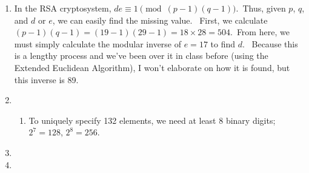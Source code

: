 \documentclass[12pt,letterpaper]{article}
\begin{document}
\pagestyle{fancy}
\rhead{\today}

\begin{enumerate}

    \item
        In the RSA cryptosystem, $de\equiv 1 \pmod {(p-1)(q-1)}$.~Thus, given $p$, $q$, and $d$ or $e$, we can easily find the missing value.~
        First, we calculate $(p-1)(q-1) = (19-1)(29-1) = 18\times28 = 504$.~From here, we must simply calculate the modular inverse of $e = 17$ to find $d$.~
        Because this is a lengthy process and we've been over it in class before (using the Extended Euclidean Algorithm), I won't elaborate on how it is found, but this inverse is 89.

    \item
        \begin{enumerate}
            \item
                To uniquely specify 132 elements, we need at least 8 binary digits; $2^7=128$, $2^8=256$.

        \end{enumerate}

    \item

    \item


\end{enumerate}
\end{document}
